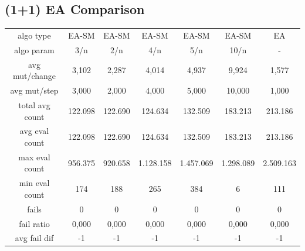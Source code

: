 \subsection{(1+1) EA Comparison}
\begin{tabular}[h]{ccccccc}
algo type&            EA-SM&     EA-SM&     EA-SM&     EA-SM&     EA-SM&        EA\\
algo param&             3/n&       2/n&       4/n&       5/n&      10/n&         -\\
avg mut/change&       3,102&     2,287&     4,014&     4,937&     9,924&     1,577\\
avg mut/step&         3,000&     2,000&     4,000&     5,000&    10,000&     1,000\\
\hline
total avg count&    122.098&   122.690&   124.634&   132.509&   183.213&   213.186\\
avg eval count&     122.098&   122.690&   124.634&   132.509&   183.213&   213.186\\
max eval count&     956.375&   920.658& 1.128.158& 1.457.069& 1.298.089& 2.509.163\\
min eval count&         174&       188&       265&       384&         6&       111\\
\hline
fails&                    0&         0&         0&         0&         0&         0\\
fail ratio&           0,000&     0,000&     0,000&     0,000&     0,000&     0,000\\
avg fail dif&            -1&        -1&        -1&        -1&        -1&        -1\\
\end{tabular}
